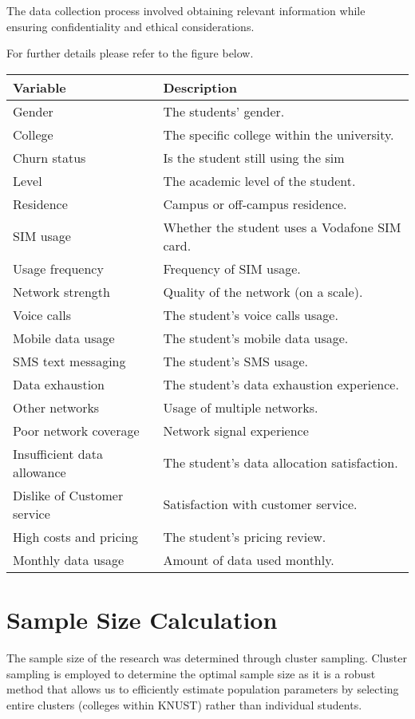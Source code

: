 \documentclass[12pt]{report}
\begin{document}
The data collection process involved obtaining relevant information while ensuring confidentiality and ethical considerations.

For further details please refer to the figure below.

\begin{tabular}{|l|l|}
\hline
\textbf{Variable} & \textbf{Description} \\
\hline
Gender & The students' gender. \\
College & The specific college within the university. \\
Churn status & Is the student still using the sim
 \\
Level & The academic level of the student. \\
Residence & Campus or off-campus residence. \\
SIM usage & Whether the student uses a Vodafone SIM card. \\
Usage frequency & Frequency of SIM usage. \\
Network strength & Quality of the network (on a scale). \\
Voice calls &  The student's voice calls usage. \\
Mobile data usage &  The student's mobile data usage. \\
SMS text messaging & The student's SMS usage. \\
Data exhaustion & The student's data exhaustion experience. \\
Other networks & Usage of multiple networks. \\
Poor network coverage & Network signal experience \\
Insufficient data allowance & The student's data allocation satisfaction. \\
 Dislike of Customer service & Satisfaction with customer service. \\
High costs and pricing &  The student's pricing review. \\
Monthly data usage & Amount of data used monthly. \\
\hline
\end{tabular}

\section{Sample Size Calculation}
The sample size of the research was determined through cluster sampling. Cluster sampling is employed to determine the optimal sample size as it is a robust method that allows us to efficiently estimate population parameters by selecting entire clusters (colleges within KNUST) rather than individual students.
\end{document}
